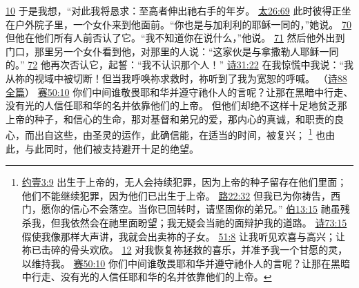 \documentclass[12pt, a4paper, oneside]{ctexart}
\begin{document}
{		\href{https://biblehub.com/psalms/77-10.htm}{10} 于是我想，“对此我将恳求：至高者伸出祂右手的年岁。
		\href{https://biblehub.com/matthew/26-69.htm}{太26:69} 此时彼得正坐在户外院子里，一个女仆来到他面前。“你也是与加利利的耶稣一同的，”她说。
		\href{https://biblehub.com/matthew/26-70.htm}{70} 但他在他们所有人前否认了它。“我不知道你在说什么，”他说。
		\href{https://biblehub.com/matthew/26-71.htm}{71} 然后他外出到门口，那里另一个女仆看到他，对那里的人说：“这家伙是与拿撒勒人耶稣一同的。”
		\href{https://biblehub.com/matthew/26-72.htm}{72} 他再次否认它，起誓：“我不认识那个人！”
		\href{https://biblehub.com/psalms/31-22.htm}{诗31:22} 在我惊慌中我说：“我从祢的视域中被切断！但当我呼唤祢求救时，祢听到了我为宽恕的呼喊。
		（\href{https://biblehub.com/niv/psalms/88.htm}{诗88全篇}）
		\href{https://biblehub.com/isaiah/50-10.htm}{赛50:10} 你们中间谁敬畏耶和华并遵守祂仆人的言呢？让那在黑暗中行走、没有光的人信任耶和华的名并依靠他们的上帝。
	}
	但他们却绝不这样十足地贫乏那上帝的种子，和信心的生命，那对基督和弟兄的爱，那内心的真诚，和职责的良心，而出自这些，由圣灵的运作，此确信能，在适当的时间，被复兴；
	\footnote {
		\href{https://biblehub.com/1_john/3-9.htm}{约壹3:9} 出生于上帝的，无人会持续犯罪，因为上帝的种子留存在他们里面；他们不能继续犯罪，因为他们已出生于上帝。
		\href{https://biblehub.com/luke/22-32.htm}{路22:32} 但我已为你祷告，西门，愿你的信心不会落空。当你已回转时，请坚固你的弟兄。”
		\href{https://biblehub.com/job/13-15.htm}{伯13:15} 祂虽残杀我，但我依然会在祂里面盼望；我无疑会当祂的面辩护我的道路。
		\href{https://biblehub.com/psalms/73-15.htm}{诗73:15} 假使我像那样大声讲，我就会出卖祢的子女。
		\href{https://biblehub.com/psalms/51-8.htm}{51:8} 让我听见欢喜与高兴；让祢已击碎的骨头欢欣。
		\href{https://biblehub.com/psalms/51-12.htm}{12} 对我恢复祢拯救的喜乐，并准予我一个甘愿的灵，以维持我。
        \href{https://biblehub.com/isaiah/50-10.htm}{赛50:10} 你们中间谁敬畏耶和华并遵守祂仆人的言呢？让那在黑暗中行走、没有光的人信任耶和华的名并依靠他们的上帝。
	}
	也由此，与此同时，他们被支持避开十足的绝望。
\end{document}
